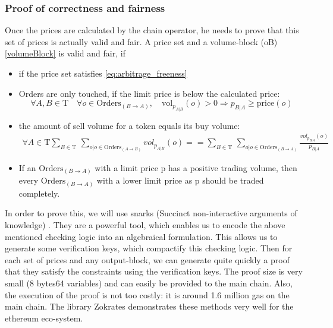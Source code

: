 \documentclass[11pt,parskip=full]{scrartcl}%
\newcommand{\Tau}{\mathrm{T}}
\begin{document}
\subsubsection{Proof of correctness and fairness}
Once the prices are calculated by the chain operator, he needs to prove that this set of prices is actually valid and fair. A  price set and a volume-block (oB) \ref{volumeBlock} is valid and fair, if
\begin{itemize}

\item if the price set satisfies \ref{eq:arbitrage_freeness} 
\item Orders are only touched, if the limit price is below the calculated price:\newline
\begin{equation} \forall A,B \in \Tau \quad \forall o \in \text{Orders}_{(B\rightarrow A)}, \quad \text{vol}_{p_{A|B}}(o)>0 \Rightarrow p_{B|A}\geq \text{price}(o)
\end{equation}
\item the amount of sell volume for a token equals its buy volume: 
\begin{equation}
\begin{split}
\forall A \in \Tau \sum_{B\in \Tau} \,
\sum_{o| o\in \text{Orders}_{(A\rightarrow B)}} vol_{p_{A|B}}(o) == \sum_{B\in \Tau} \, \sum_{o| o\in \text{Orders}_{(B\rightarrow A)}} \frac{vol_{p_{B|A}}(o)}{p_{B|A}}
\end{split}
\end{equation}
\item If an $\text{Orders}_{(B\rightarrow A)}$ with a limit price p has a positive trading volume, then every $\text{Orders}_{(B\rightarrow A)}$ with a lower limit price as p should be traded completely.
\end{itemize}

In order to prove this, we will use snarks (Succinct non-interactive arguments of knowledge) \cite{snarks}. They are a powerful tool, which enables us to encode the above mentioned checking logic into an algebraical formulation. This allows us to generate some verification keys, which compactify this checking logic. Then for each set of prices and any output-block, we can generate quite quickly a proof that they satisfy the constraints using the verification keys. The proof size is very small (8 bytes64 variables) and can easily be provided to the main chain. Also, the execution of the proof is not too costly: it is around 1.6 million gas on the main chain. The library Zokrates demonstrates these methods very well for the ethereum eco-system.
\end{document}
